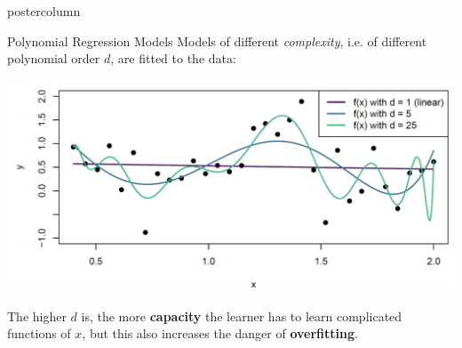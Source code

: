 \documentclass{beamer}
\begin{document}
\begin{frame}[fragile]{}
\begin{columns}
\begin{column}{.31\textwidth}
\begin{beamercolorbox}[center]{postercolumn}
\begin{minipage}{.98\textwidth}
{\begin{myblock}{Polynomial Regression Models}
    Models of different \emph{complexity}, i.e. of different polynomial order $d$, are fitted to the data:
    
    \includegraphics[width=0.9\columnwidth]{img/poly_reg.PNG}
  

  The higher $d$ is, the more \textbf{capacity} the learner has to learn complicated functions of $x$, but
  this also increases the danger of \textbf{overfitting}.
  
  \vspace*{1ex}
  
  \end{myblock}
  
  
}

\end{minipage}
\end{beamercolorbox}
\end{column}

\end{columns}
\end{frame}
\end{document}
